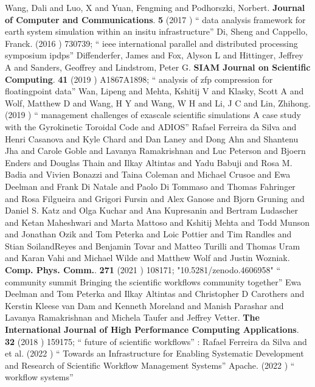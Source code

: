 \documentclass{article}
\begin{document}
\begin{thebibliography}{99}
 Wang, Dali and Luo, X and Yuan, Fengming and Podhorszki, Norbert. {\bf Journal of Computer and Communications}. {\bf 5} (2017 ) `` data analysis framework for earth system simulation within an insitu infrastructure''
 Di, Sheng and Cappello, Franck. (2016 ) 730739; `` ieee international parallel and distributed processing symposium ipdps''
 Diffenderfer, James and Fox, Alyson L and Hittinger, Jeffrey A and Sanders, Geoffrey and Lindstrom, Peter G. {\bf SIAM Journal on Scientific Computing}. {\bf 41} (2019 ) A1867A1898; `` analysis of zfp compression for floatingpoint data''
 Wan, Lipeng and Mehta, Kshitij V and Klasky, Scott A and Wolf, Matthew D and Wang, H Y and Wang, W H and Li, J C and Lin, Zhihong. (2019 ) `` management challenges of exascale scientific simulations A case study with the Gyrokinetic Toroidal Code and ADIOS''
 Rafael Ferreira da Silva and Henri Casanova and Kyle Chard and Dan Laney and Dong Ahn and Shantenu Jha and Carole Goble and Lavanya Ramakrishnan and Luc Peterson and Bjoern Enders and Douglas Thain and Ilkay Altintas and Yadu Babuji and Rosa M. Badia and Vivien Bonazzi and Taina Coleman and Michael Crusoe and Ewa Deelman and Frank Di Natale and Paolo Di Tommaso and Thomas Fahringer and Rosa Filgueira and Grigori Fursin and Alex Ganose and Bjorn Gruning and Daniel S. Katz and Olga Kuchar and Ana Kupresanin and Bertram Ludascher and Ketan Maheshwari and Marta Mattoso and Kshitij Mehta and Todd Munson and Jonathan Ozik and Tom Peterka and Loic Pottier and Tim Randles and Stian SoilandReyes and Benjamin Tovar and Matteo Turilli and Thomas Uram and Karan Vahi and Michael Wilde and Matthew Wolf and Justin Wozniak. {\bf  Comp. Phys. Comm.}. {\bf   271} (2021 )    108171; "10.5281/zenodo.4606958" `` community summit Bringing the scientific workflows community together''
  Ewa Deelman and Tom Peterka and Ilkay Altintas and Christopher D Carothers and Kerstin Kleese van Dam and Kenneth Moreland and Manish Parashar and Lavanya Ramakrishnan and Michela Taufer and Jeffrey Vetter. {\bf  The International Journal of High Performance Computing Applications}. {\bf  32} (2018 )  159175; `` future of scientific workflows''  :  
 Rafael Ferreira da Silva and et al. (2022 ) `` Towards an Infrastructure for Enabling Systematic Development and Research of Scientific Workflow Management Systems''
 Apache. (2022 ) `` workflow systems''

\end{thebibliography}
\end{document}
